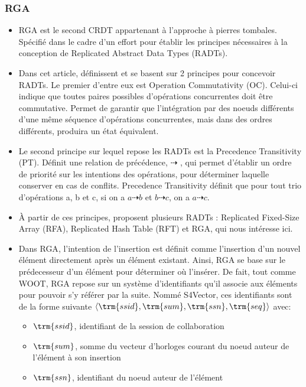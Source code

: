 \subsubsection{\acl{RGA}}

\begin{itemize}
  \item \acf{RGA} \cite{ROH2011354} est le second \ac{CRDT} appartenant à l'approche à pierres tombales.
    Spécifié dans le cadre d'un effort pour établir les principes nécessaires à la conception de Replicated Abstract Data Types (RADTs).
  \item Dans cet article, définissent et se basent sur 2 principes pour concevoir RADTs.
    Le premier d'entre eux est Operation Commutativity (OC).
    Celui-ci indique que toutes paires possibles d'opérations concurrentes doit être commutative.
    Permet de garantir que l'intégration par des noeuds différents d'une même séquence d'opérations concurrentes, mais dans des ordres différents, produira un état équivalent.
  \item Le second principe sur lequel repose les RADTs est la Precedence Transitivity (PT).
    Définit une relation de précédence, $\dashrightarrow$ , qui permet d'établir un ordre de priorité sur les intentions des opérations, pour déterminer laquelle conserver en cas de conflits.
    Precedence Transitivity définit que pour tout trio d'opérations a, b et c, si on a $a \dashrightarrow b$ et $b \dashrightarrow c$, on a $a \dashrightarrow c$.
  \item À partir de ces principes, proposent plusieurs RADTs : Replicated Fixed-Size Array (RFA), Replicated Hash Table (RFT) et \acf{RGA}, qui nous intéresse ici.
  \item Dans \ac{RGA}, l'intention de l'insertion est définit comme l'insertion d'un nouvel élément directement après un élément existant.
    Ainsi, \ac{RGA} se base sur le prédecesseur d'un élément pour déterminer où l'insérer.
    De fait, tout comme WOOT, \ac{RGA} repose sur un système d'identifiants qu'il associe aux éléments pour pouvoir s'y référer par la suite.
    Nommé S4Vector, ces identifiants sont de la forme suivante $\langle \trm{ssid},\trm{sum},\trm{ssn},\trm{seq} \rangle$ avec:
    \begin{itemize}
      \item $\trm{ssid}$, identifiant de la session de collaboration
      \item $\trm{sum}$, somme du vecteur d'horloges courant du noeud auteur de l'élément à son insertion
      \item $\trm{ssn}$, identifiant du noeud auteur de l'élément

\end{itemize}
\end{itemize}

